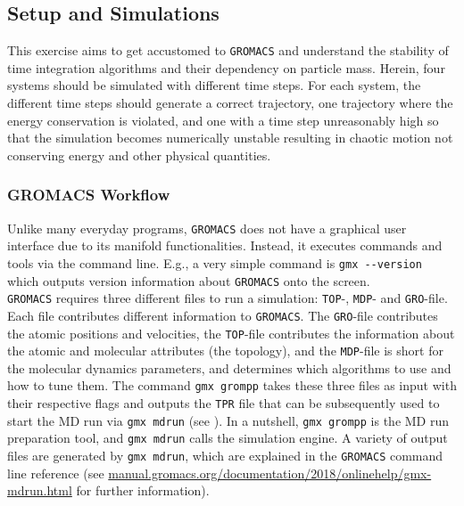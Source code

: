 \documentclass[9pt,tutorial]{livecoms}
\newcommand{\code}[1]{\colorbox{light-gray}{\texttt{#1}}}
\begin{document}
\subsection*{Setup and Simulations}
This exercise aims to get accustomed to \texttt{GROMACS} and understand the stability of time integration algorithms and their dependency on particle mass. Herein, four systems should be simulated with different time steps. For each system, the different time steps should generate a correct trajectory, one trajectory where the energy conservation is violated, and one with a time step unreasonably high so that the simulation becomes numerically unstable resulting in chaotic motion not conserving energy and other physical quantities. 


\subsubsection*{GROMACS Workflow}
Unlike many everyday programs, \texttt{GROMACS} does not have a graphical user interface due to its manifold functionalities. Instead, it executes commands and tools via the command line. E.g., a very simple command is \code{gmx -{}-version} which outputs version information about \texttt{GROMACS} onto the screen.\\
\texttt{GROMACS} requires three different files to run a simulation: \texttt{TOP}-, \texttt{MDP}- and \texttt{GRO}-file. Each file contributes different information to \texttt{GROMACS}. The \texttt{GRO}-file contributes the atomic positions and velocities, the \texttt{TOP}-file contributes the information about the atomic and molecular attributes (the topology), and the \texttt{MDP}-file is short for the molecular dynamics parameters, and determines which algorithms to use and how to tune them. The command \code{gmx grompp} takes these three files as input with their respective flags and outputs the \texttt{TPR} file that can be subsequently used to start the MD run via \code{gmx mdrun} (see ). In a nutshell, \code{gmx grompp} is the MD run preparation tool, and \code{gmx mdrun} calls the simulation engine. A variety of output files are generated by \code{gmx mdrun}, which are explained in the \texttt{GROMACS} command line reference (see \url{manual.gromacs.org/documentation/2018/onlinehelp/gmx-mdrun.html} for further information). 
\end{document}
